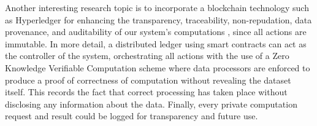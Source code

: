 Another interesting research topic is to incorporate a blockchain technology such as Hyperledger \cite{cachin2016architecture} for enhancing the transparency, traceability,  non-repudation, data provenance, and auditability of our system's computations \cite{zyskind2015decentralizing}, since all actions are immutable.
In more detail, a distributed ledger using smart contracts can act as the controller of the system, orchestrating all actions with the use of a Zero Knowledge Verifiable Computation scheme \cite{blum1991noninteractive} where data processors are enforced to produce a proof of correctness of computation without revealing the dataset itself.
This records the fact that correct processing has taken place without disclosing any information about the data.
Finally, every private computation request and result could be logged for transparency and future use.


